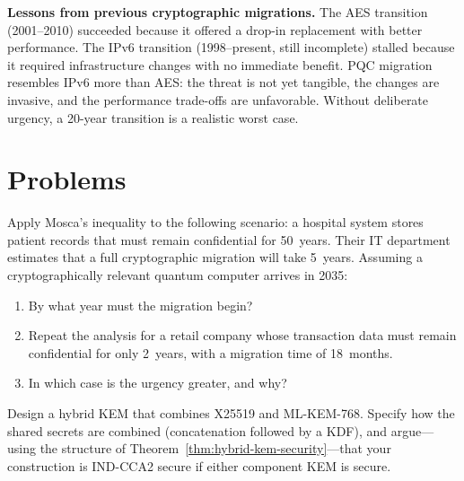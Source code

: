 \begin{svgraybox}
\textbf{Lessons from previous cryptographic migrations.}
The AES transition (2001--2010) succeeded because it offered a drop-in replacement with better performance.  The IPv6 transition (1998--present, still incomplete) stalled because it required infrastructure changes with no immediate benefit.  PQC migration resembles IPv6 more than AES: the threat is not yet tangible, the changes are invasive, and the performance trade-offs are unfavorable.  Without deliberate urgency, a 20-year transition is a realistic worst case.
\end{svgraybox}


\section*{Problems}

\begin{prob}
\label{prob:ch13-mosca}
Apply Mosca's inequality to the following scenario: a hospital system stores patient records that must remain confidential for 50~years.  Their IT department estimates that a full cryptographic migration will take 5~years.  Assuming a cryptographically relevant quantum computer arrives in 2035:
\begin{enumerate}
\item[(a)] By what year must the migration begin?
\item[(b)] Repeat the analysis for a retail company whose transaction data must remain confidential for only 2~years, with a migration time of 18~months.
\item[(c)] In which case is the urgency greater, and why?
\end{enumerate}
\end{prob}

\begin{prob}
\label{prob:ch13-hybrid-kem}
Design a hybrid KEM that combines X25519 and ML-KEM-768.  Specify how the shared secrets are combined (concatenation followed by a KDF), and argue---using the structure of Theorem~\ref{thm:hybrid-kem-security}---that your construction is IND-CCA2 secure if either component KEM is secure.
\end{prob}

